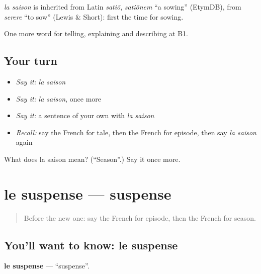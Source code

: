 \begin{cousinweb}
\emph{la saison} is inherited from Latin \emph{satiō}, \emph{satiōnem} \textquotedblleft{}a sowing\textquotedblright{} (EtymDB), from \emph{serere} \textquotedblleft{}to sow\textquotedblright{} (Lewis \& Short): first the time for sowing.
\end{cousinweb}

\begin{grammarlens}[title={What you've built}]
One more word for telling, explaining and describing at B1.
\end{grammarlens}

\subsection*{Your turn}
\begin{itemize}
\raggedright
  \item \emph{Say it:} \emph{la saison}
  \item \emph{Say it:} \emph{la saison}, once more
  \item \emph{Say it:} a sentence of your own with \emph{la saison}
  \item \emph{Recall:} say the French for tale, then the French for episode, then say \emph{la saison} again
\end{itemize}

\begin{tcolorbox}[breakable,colback=teal!4,colframe=teal!35!black,title={Before you move on}]
What does la saison mean? (\textquotedblleft{}Season\textquotedblright{}.) Say it once more.
\end{tcolorbox}
\section[le suspense]{le suspense — suspense}

\label{lesson:FR-C523-suspense}



\begin{quote}
Before the new one: say the French for episode, then the French for season.
\end{quote}

\subsection*{You'll want to know: le suspense}
\textbf{le suspense} — \textquotedblleft{}suspense\textquotedblright{}.

